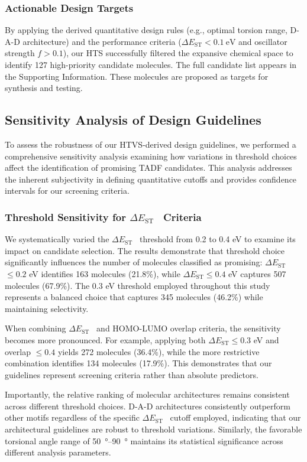 \documentclass[journal=jcisd8,manuscript=article,keywords=true]{achemso}
\newcommand{\deltaest}{$\Delta E_{\text{ST}}$}
\begin{document}
\subsubsection{Actionable Design Targets}
By applying the derived quantitative design rules (e.g., optimal torsion range, D-A-D architecture) and the performance criteria (\deltaest $< \qty{0.1}{\electronvolt}$ and oscillator strength $f > 0.1$), our HTS successfully filtered the expansive chemical space to identify \num{127} high-priority candidate molecules. The full candidate list appears in the Supporting Information. These molecules are proposed as targets for synthesis and testing.

\subsection{Sensitivity Analysis of Design Guidelines}

To assess the robustness of our HTVS-derived design guidelines, we performed a comprehensive sensitivity analysis examining how variations in threshold choices affect the identification of promising TADF candidates. This analysis addresses the inherent subjectivity in defining quantitative cutoffs and provides confidence intervals for our screening criteria.

\subsubsection{Threshold Sensitivity for \deltaest~ Criteria}

We systematically varied the \deltaest~ threshold from 0.2 to 0.4 eV to examine its impact on candidate selection. The results demonstrate that threshold choice 
significantly influences the number of molecules classified as promising: \deltaest~ $\leq 0.2$ eV identifies 163 molecules (21.8\%), while \deltaest $\leq 
0.4$ eV captures 507 molecules (67.9\%). The 0.3 eV threshold employed throughout this study represents a balanced choice that captures 345 molecules (46.2\%) 
while maintaining selectivity.

When combining \deltaest~ and HOMO-LUMO overlap criteria, the sensitivity becomes more pronounced. For example, applying both \deltaest $\leq 0.3$ eV and 
overlap $\leq 0.4$ yields 272 molecules (36.4\%), while the more restrictive combination identifies 134 molecules (17.9\%). This demonstrates that our 
guidelines represent screening criteria rather than absolute predictors.

Importantly, the relative ranking of molecular architectures remains consistent across different threshold choices. D-A-D architectures consistently outperform 
other motifs regardless of the specific \deltaest~ cutoff employed, indicating that our architectural guidelines are robust to threshold variations. Similarly, 
the favorable torsional angle range of \qtyrange{50}{90}{\degree} maintains its statistical significance across different analysis parameters.
\end{document}
